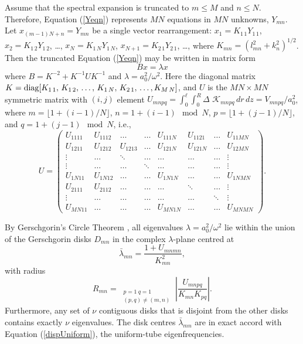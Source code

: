 \documentclass[12pt]{iopart}
\renewcommand{\L}{{\ell}}
\newcommand{\diag}{\mathop{\rm diag}}
\begin{document}
Assume that the spectral expansion is truncated to $m\le M$ and $n\le N$. Therefore, Equation (\ref{Yeqn}) represents $MN$ equations in $MN$ unknowns, $Y_{mn}$. Let $x_{(m-1)N+n}=Y_{mn}$ be a single vector rearrangement: $x_1=K_{1\,1}Y_{1\,1}$, $x_2=K_{1\,2}Y_{1\,2}$, \ldots, $x_N=K_{1\,N}Y_{1\,N}$, $x_{N+1}=K_{2\,1}Y_{2\,1}$, \ldots, where $K_{mn}=(l_{mn}^2+k_n^2)^{1/2}$. Then the truncated Equation (\ref{Yeqn}) may be written in matrix form
\begin{equation}
Bx=\lambda x  \label{Bx}
\end{equation}
where $B=K^{-2}+K^{-1}U K^{-1}$ and $\lambda=a_0^2/\omega^2$. Here the diagonal matrix $K=\diag[K_{1\,1},\,K_{1\,2},\,\ldots,\, K_{1\,N},\, K_{2\,1},\,\ldots,K_{M\,N}]$, and $U$ is the $MN\times MN$ symmetric matrix with $(i,j)$ element $U_{mnpq}=\int_0^\L\int_0^R \Delta\,\,\mathcal{K}_{mnpq}\,dr\,dz=V_{mnpq}/a_0^2$, where { $m=\lfloor 1+(i-1)/N\rfloor$, $n=1+(i-1)\!\!\mod N$, $p=\lfloor 1+(j-1)/N\rfloor$, and $q=1+(j-1)\!\!\mod N$}, i.e.,
\begin{equation}
U=
\begin{pmatrix}
U_{1111}& U_{1112} &\ldots & \ldots &U_{111N} & U_{1121} & \ldots & U_{11MN}\\[4pt]
U_{1211} &U_{1212} & U_{1213} & \ldots & U_{121N} & U_{121N} & \ldots & U_{12MN} \\
\vdots & \ldots & \ddots & \ldots & \ldots & \ldots & \ldots & \vdots \\
\vdots & \ldots &  \ldots & \ddots & \ldots & \ldots & \ldots & \vdots \\
U_{1N11} & U_{1N12} & \ldots & \ldots & U_{1N1N} & \ldots & \ldots & U_{1NMN} \\
U_{2111} & U_{2112} & \ldots & \ldots & \ldots & \ddots & \ldots & \vdots \\
\vdots & \ldots & \ldots & \ldots & \ldots & \ldots & \ddots & \vdots \\
U_{MN11} & \ldots & \ldots & \ldots & U_{MN1N} & \ldots & \ldots &  U_{MNMN}
\end{pmatrix}.
\end{equation}

By Gerschgorin's Circle Theorem \cite{Ger31aa}, all eigenvalues $\lambda=a_0^2/\omega^2$ lie within the union of the Gerschgorin disks $D_{mn}$ in the complex $\lambda$-plane centred at
\begin{equation}
\bar\lambda_{mn} = \frac{1+U_{mnmn}}{K_{mn}^2},  \label{Lambda}
\end{equation}
with radius
\begin{equation}
R_{mn}=\mathop{\sum^\infty\sum^\infty}_{\substack{p=1\ q=1\\ (p,q)\ne(m,n)}} \left|\frac{U_{mnpq}}{K_{mn}K_{pq}}\right| .
\end{equation}
Furthermore, any set of $\nu$ contiguous disks that is disjoint from the other disks contains exactly $\nu$ eigenvalues. The disk centres $\bar\lambda_{mn}$ are in exact accord with Equation (\ref{dispUniform}), the uniform-tube eigenfrequencies.
\end{document}
